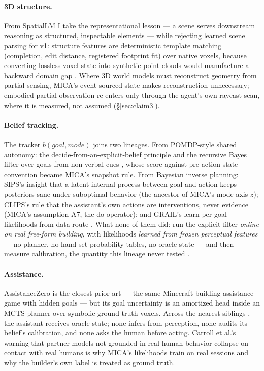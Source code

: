 \documentclass[11pt]{article}
\begin{document}
\paragraph{3D structure.} From SpatialLM \cite{spatiallm} I take the
representational lesson --- a scene serves downstream reasoning as structured,
inspectable elements --- while rejecting learned scene parsing for v1:
structure features are deterministic template matching (completion, edit
distance, registered footprint fit) over native voxels, because converting
lossless voxel state into synthetic point clouds would manufacture a backward
domain gap \cite{syn2real}. Where 3D world models must reconstruct geometry
from partial sensing, MICA's event-sourced state makes reconstruction
unnecessary; embodied partial observation re-enters only through the agent's
own raycast scan, where it is measured, not assumed (\S\ref{sec:claim3}).

\paragraph{Belief tracking.} The tracker $b(\textit{goal},\textit{mode})$
joins two lineages. From POMDP-style shared autonomy: the
decide-from-an-explicit-belief principle \cite{apomdp} and the recursive Bayes
filter over goals from non-verbal cues \cite{jainargall}, whose
score-against-pre-action-state convention became MICA's snapshot rule. From
Bayesian inverse planning: SIPS's insight that a latent internal process
between goal and action keeps posteriors sane under suboptimal behavior
\cite{sips} (the ancestor of MICA's mode axis $z$); CLIPS's rule that the
assistant's own actions are interventions, never evidence \cite{clips} (MICA's
assumption A7, the do-operator); and GRAIL's
learn-per-goal-likelihoods-from-data route \cite{grail}. What none of them
did: run the explicit filter \emph{online on real free-form building}, with
likelihoods \emph{learned from frozen perceptual features} --- no planner, no
hand-set probability tables, no oracle state --- and then measure calibration,
the quantity this lineage never tested \cite{guo}.

\paragraph{Assistance.} AssistanceZero \cite{assistancezero} is the closest
prior art --- the same Minecraft building-assistance game with hidden goals ---
but its goal uncertainty is an amortized head inside an MCTS planner over
symbolic ground-truth voxels. Across the nearest siblings
\cite{assistancezero,wah,nopa}, the assistant receives oracle state; none
infers from perception, none audits its belief's calibration, and none asks
the human before acting. Carroll et al.'s warning that partner models not
grounded in real human behavior collapse on contact with real humans
\cite{carroll} is why MICA's likelihoods train on real sessions and why the
builder's own label is treated as ground truth.
\end{document}
